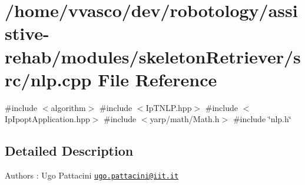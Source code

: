 \section{/home/vvasco/dev/robotology/assistive-\/rehab/modules/skeleton\+Retriever/src/nlp.cpp File Reference}
\label{nlp_8cpp}
{\ttfamily \#include $<$algorithm$>$}\newline
{\ttfamily \#include $<$Ip\+T\+N\+L\+P.\+hpp$>$}\newline
{\ttfamily \#include $<$Ip\+Ipopt\+Application.\+hpp$>$}\newline
{\ttfamily \#include $<$yarp/math/\+Math.\+h$>$}\newline
{\ttfamily \#include \char`\"{}nlp.\+h\char`\"{}}\newline


\subsection{Detailed Description}
\begin{DoxyAuthor}{Authors}
\+: Ugo Pattacini \href{mailto:ugo.pattacini@iit.it}{\tt ugo.\+pattacini@iit.\+it} 
\end{DoxyAuthor}
